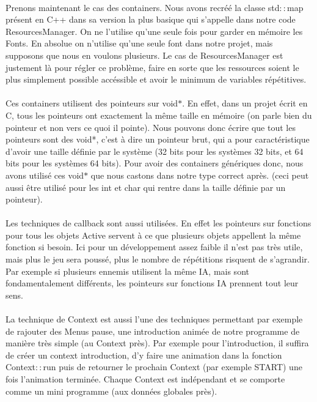 \paragraph{} Prenons maintenant le cas des containers. Nous avons recréé la classe std$::$map présent en C++ dans sa version la plus basique qui s'appelle dans notre code ResourcesManager. On ne l'utilise qu'une seule fois pour garder en mémoire les Fonts. En absolue on n'utilise qu'une seule font dans notre projet, mais supposons que nous en voulons plusieurs. Le cas de ResourcesManager est justement là pour régler ce problème, faire en sorte que les ressources soient le plus simplement possible accéssible et avoir le minimum de variables répétitives.
\paragraph{} Ces containers utilisent des pointeurs sur void$*$. En effet, dans un projet écrit en C, tous les pointeurs ont exactement la même taille en mémoire (on parle bien du pointeur et non vers ce quoi il pointe). Nous pouvons donc écrire que tout les pointeurs sont des void*, c'est à dire un pointeur brut, qui a pour caractéristique d'avoir une taille définie par le système (32 bits pour les systèmes 32 bits, et 64 bits pour les systèmes 64 bits). Pour avoir des containers génériques donc, nous avons utilisé ces void$*$ que nous castons dans notre type correct après. (ceci peut aussi être utilisé pour les int et char qui rentre dans la taille définie par un pointeur).
\paragraph{} Les techniques de callback sont aussi utilisées. En effet les pointeurs sur fonctions pour tous les objets Active servent à ce que plusieurs objets appellent la même fonction si besoin. Ici pour un développement assez faible il n'est pas très utile, mais plus le jeu sera poussé, plus le nombre de répétitions risquent de s'agrandir. Par exemple si plusieurs ennemis utilisent la même IA, mais sont fondamentalement différents, les pointeurs sur fonctions IA prennent tout leur sens.
\paragraph{} La technique de Context est aussi l'une des techniques permettant par exemple de rajouter des Menus pause, une introduction animée de notre programme de manière très simple (au Context près). Par exemple pour l'introduction, il suffira de créer un context introduction, d'y faire une animation dans la fonction Context$::$run puis de retourner le prochain Context (par exemple START) une fois l'animation terminée. Chaque Context est indépendant et se comporte comme un mini programme (aux données globales près).

